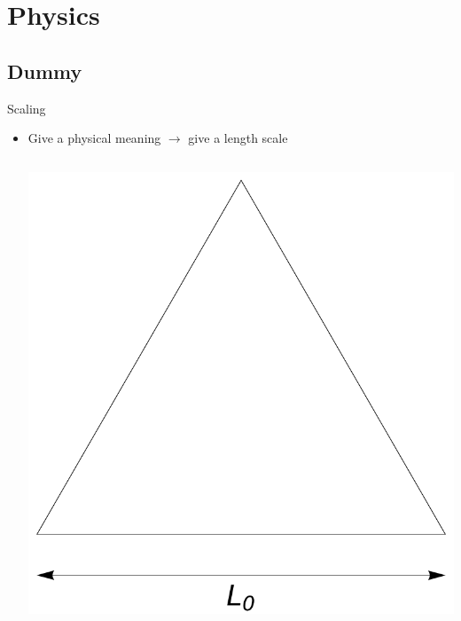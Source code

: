 \documentclass[xcolor=x11names,compress,professionalfonts]{beamer}
\renewcommand{\(}{\begin{columns}}
\renewcommand{\)}{\end{columns}}
\newcommand{\<}[1]{\begin{column}{#1}}
\renewcommand{\>}{\end{column}}
\begin{document}
\section{Physics}
\subsection{Dummy}
\begin{frame}{Scaling}

\begin{itemize}
	\item Give a physical meaning $\rightarrow$ give a length scale

\begin{columns}
\newcommand{\s}{.2}
  \begin{column}{3cm}
  \centering
    \includegraphics[scale=\s]{scale0.pdf}
  \end{column}


\end{columns}
\end{itemize}
\end{frame}
\end{document}
